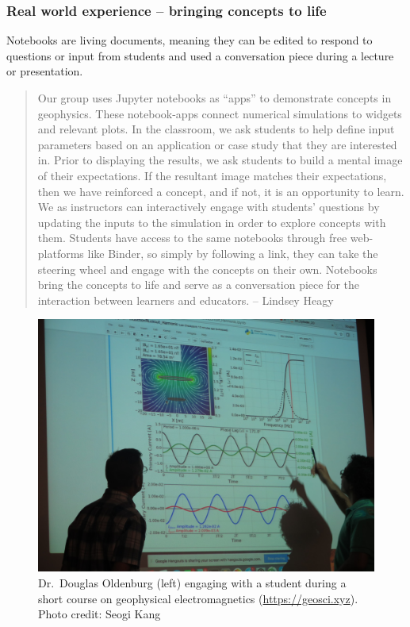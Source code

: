 \documentclass[]{book}
\begin{document}
\subsubsection{Real world experience -- bringing concepts to
life}\label{real-world-experience-bringing-concepts-to-life}

Notebooks are living documents, meaning they can be edited to respond to
questions or input from students and used a conversation piece during a
lecture or presentation.

\begin{quote}
Our group uses Jupyter notebooks as ``apps'' to demonstrate concepts in
geophysics. These notebook-apps connect numerical simulations to widgets
and relevant plots. In the classroom, we ask students to help define
input parameters based on an application or case study that they are
interested in. Prior to displaying the results, we ask students to build
a mental image of their expectations. If the resultant image matches
their expectations, then we have reinforced a concept, and if not, it is
an opportunity to learn. We as instructors can interactively engage with
students' questions by updating the inputs to the simulation in order to
explore concepts with them. Students have access to the same notebooks
through free web-platforms like Binder, so simply by following a link,
they can take the steering wheel and engage with the concepts on their
own. Notebooks bring the concepts to life and serve as a conversation
piece for the interaction between learners and educators. -- Lindsey
Heagy
\end{quote}

\begin{figure}
\centering
\includegraphics{images/oldenburg-geosci.jpg}
\caption{Dr.~Douglas Oldenburg (left) engaging with a student during a
short course on geophysical electromagnetics (\url{https://geosci.xyz}).
Photo credit: Seogi Kang}
\end{figure}
\end{document}
